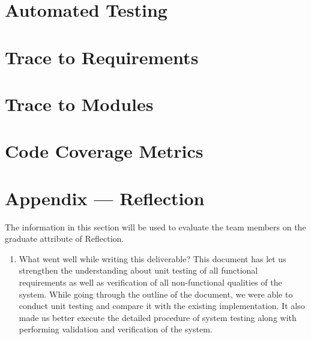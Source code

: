 \documentclass[12pt, titlepage]{article}
\begin{document}
\begin{enumerate}
\begin{enumerate}
\begin{enumerate}
\begin{enumerate}
\begin{enumerate}
\begin{enumerate}
\begin{enumerate}
\begin{enumerate}
\begin{enumerate}

\section{Automated Testing}
		
\section{Trace to Requirements}
		
\section{Trace to Modules}		

\section{Code Coverage Metrics}




\newpage{}
\section*{Appendix --- Reflection}

The information in this section will be used to evaluate the team members on the
graduate attribute of Reflection.



\begin{enumerate}
  \item What went well while writing this deliverable?
  This document has let us strengthen the understanding about unit testing of all functional requirements as well as verification of all non-functional qualities of the system. While going through the outline of the document, we were able to conduct unit testing and compare it with the existing implementation. It also made us better execute the detailed procedure of system testing along with performing validation and verification of the system. 


\end{enumerate}
\end{enumerate}
\end{enumerate}
\end{enumerate}
\end{enumerate}
\end{enumerate}
\end{enumerate}
\end{enumerate}
\end{enumerate}
\end{enumerate}
\end{document}
